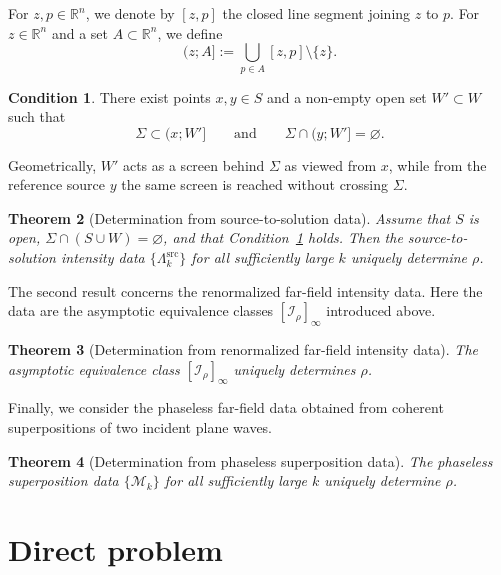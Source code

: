 \documentclass[12pt,a4paper]{amsart}
\numberwithin{equation}{section}
\theoremstyle{plain}
\newtheorem{theorem}{Theorem}[section]
\theoremstyle{definition}
\newtheorem{condition}[theorem]{Condition}
\begin{document}
For $z,p\in\mathbb{R}^n$, we denote by $[z,p]$ the closed line segment
joining $z$ to $p$. For $z\in\mathbb{R}^n$ and a set
$A\subset\mathbb{R}^n$, we define
\begin{equation*}
    (z;A] := \bigcup_{p\in A}[z,p]\setminus\{z\}.
\end{equation*}


\begin{condition}\label{cond:geometric}
There exist points $x,y\in S$ and a non-empty open set $W'\subset W$ such that
\begin{equation*}
    \Sigma \subset (x;W']
    \qquad
    \text{and}
    \qquad
    \Sigma \cap (y;W'] = \varnothing.
\end{equation*}
\end{condition}

Geometrically, $W'$ acts as a screen behind $\Sigma$ as viewed from $x$, while
from the reference source $y$ the same screen is reached without crossing
$\Sigma$.

\begin{theorem}[Determination from source-to-solution data]
\label{thm:source_recovery}
Assume that $S$ is open, $\Sigma\cap(S\cup W)=\varnothing$, and that
Condition~\ref{cond:geometric} holds. Then the source-to-solution intensity
data $\{\Lambda_k^{\mathrm{src}}\}$ for all sufficiently large $k$ uniquely determine $\rho$.
\end{theorem}

The second result concerns the renormalized far-field intensity data. Here the
data are the asymptotic equivalence classes $[\mathcal I_\rho]_\infty$
introduced above.

\begin{theorem}[Determination from renormalized far-field intensity data]
\label{thm:intensity_determines_rho}
The asymptotic equivalence class $[\mathcal I_\rho]_\infty$ uniquely
determines $\rho$.
\end{theorem}

Finally, we consider the phaseless far-field data obtained from coherent
superpositions of two incident plane waves.

\begin{theorem}[Determination from phaseless superposition data]
\label{thm:phaseless_superposed}
The phaseless superposition data $\{\mathcal M_k\}$ for all sufficiently large $k$ uniquely determine $\rho$.
\end{theorem}



\section{Direct problem}\label{sec:direct}
\end{document}
